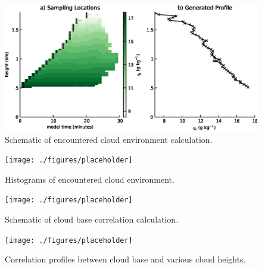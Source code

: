\documentclass[acp]{copernicus}
\begin{document}
\begin{figure}[t]
\vspace*{2mm}
\begin{center}
\includegraphics[width=\textwidth]{./figures/cloud_environment_schematic}
\end{center}
\caption{Schematic of encountered cloud environment calculation.}
\label{fig:cloud_environment_schematic}
\end{figure}

\begin{figure}[t]
\vspace*{2mm}
\begin{center}
\texttt{[image: ./figures/placeholder]}
\end{center}
\caption{Histograms of encountered cloud environment.}
\label{fig:cloud_envionment_histograms}
\end{figure}

\begin{figure}[t]
\vspace*{2mm}
\begin{center}
\texttt{[image: ./figures/placeholder]}
\end{center}
\caption{Schematic of cloud base correlation calculation.}
\label{fig:cloud_base_schematic}
\end{figure}

\begin{figure}[t]
\vspace*{2mm}
\begin{center}
\texttt{[image: ./figures/placeholder]}
\end{center}
\caption{Correlation profiles between cloud base and various cloud heights.}
\label{fig:cloud_envionment_histograms}
\end{figure}


\end{document}
